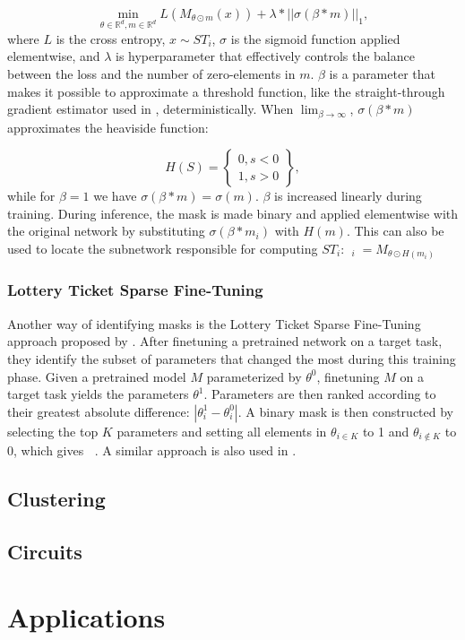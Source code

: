 \documentclass[11pt]{article}
\DeclareMathOperator*{\mini}{min}
\DeclareMathOperator*{\subnetwork}{\hat{\theta}}
\begin{document}
\begin{equation}
\mini_{\theta \in \mathbb {R}^d, m \in \mathbb{R}^d} L (M_{\theta \odot m}(x)) + \lambda * ||\sigma(\beta * m)||_1,
\end{equation}
where $L$ is the cross entropy, $x \sim ST_i$, $\sigma$ is the sigmoid function applied elementwise, and $\lambda$ is hyperparameter that effectively controls the balance between the loss and the number of zero-elements in $m$. $\beta$ is a parameter that makes it possible to approximate a threshold function, like the straight-through gradient estimator used in \citet{csordas2020neural}, deterministically. When $\lim_{\beta\to\infty}$, $\sigma(\beta * m)$ approximates the heaviside function:

\begin{equation}
    H(S)=
    \left\{
    \begin{array}{lr}
      0,  s < 0 \\
      1,  s > 0
    \end{array}
    \right\},
\end{equation}
while for $\beta=1$ we have $\sigma(\beta * m) = \sigma(m)$. $\beta$ is increased linearly during training. During inference, the mask is made binary and applied elementwise with the original network by substituting $\sigma(\beta * m_i)$ with $H(m)$. This can also be used to locate the subnetwork responsible for computing $ST_i$: $\subnetwork_i = M_{\theta \odot H(m_i)}$

\subsubsection{Lottery Ticket Sparse Fine-Tuning}
Another way of identifying masks is the Lottery Ticket Sparse Fine-Tuning approach proposed by \citet{ansell-etal-2022-composable}. After finetuning a pretrained network on a target task, they identify the subset of parameters that changed the most during this training phase. Given a pretrained model $M$ parameterized by $\theta^0$, finetuning $M$ on a target task yields the parameters $\theta^1$. Parameters are then ranked according to their greatest absolute difference: $|\theta^1_i - \theta^0_i|$. A binary mask is then constructed by selecting the top $K$ parameters and setting all elements in $\theta_{i \in K}$ to 1 and $\theta_{i \notin K}$ to 0, which gives $\subnetwork$. A similar approach is also used in \citet{frankle2018the}.

\subsection{Clustering}
\citet{watanabe2019interpreting, casper2022graphical}
\subsection{Circuits}
\citep{conmy2023towards, nanda2023progress, wang2023interpretability}
\section{Applications}
\newpage

\end{document}
